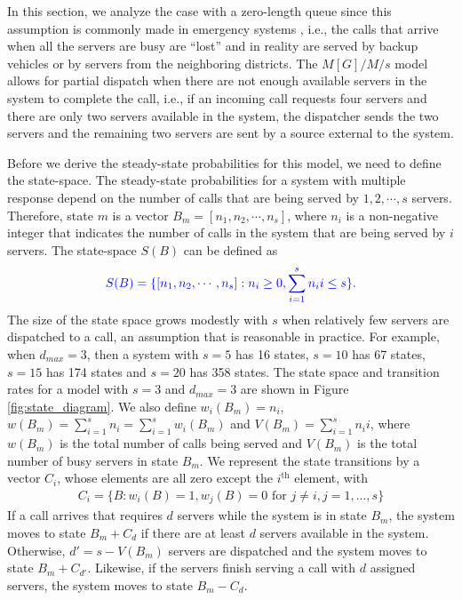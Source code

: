 \documentclass[11pt]{article}\topmargin 0mm
\begin{document}
In this section, we analyze the case with a zero-length queue
since this assumption is commonly made in emergency systems
\citep{iannoni2007multiple}, i.e., the calls that arrive when
all the servers are busy are ``lost'' and in reality are served
by backup vehicles or by servers from the neighboring
districts. The $M[G]/M/s$ model allows for partial dispatch
when there are not enough available servers in the system to
complete the call, i.e., if an incoming call requests four
servers and there are only two servers available in the system,
the dispatcher sends the two servers and the remaining two
servers are sent by a source external to the system.

Before we derive the steady-state probabilities for this model,
we need to define the state-space.
The steady-state probabilities for a system with multiple
response depend on the number of calls that are being served by
$1,2,\cdots,s$ servers. Therefore, state $m$ is a vector $B_m =
[n_1, n_2, \cdots, n_s]$, where $n_i$ is a non-negative integer
that indicates the number of calls in the system that are being
served by $i$ servers. The state-space $S(B)$ can be defined as
\begin{equation}
\label{eq:state_space}
\begin{split}
\color{blue}S(B) = \{[n_1, n_2, \cdots, n_s]:n_i\geq 0, \sum_{i=1}^s n_ii \leq s \}.
\end{split}
\end{equation}
The size of the state space grows modestly with $s$ when relatively few servers are dispatched to a call, an
assumption that is reasonable in practice. For example, when
$d_{max}=3$, then a system with $s=5$ has 16 states, $s=10$ has
67 states, $s=15$ has 174 states and $s=20$ has 358 states. The state space and transition rates for a model with $s=3$ and $d_{max}=3$ are shown in Figure \ref{fig:state_diagram}. We
also define $w_i(B_m)=n_i$, $w(B_m)=\sum_{i=1}^{s} n_i =
\sum_{i=1}^{s} w_i(B_m)$ and $V(B_m)=\sum_{i=1}^{s} n_ii$,
where $w(B_m)$ is the total number of calls being served and
$V(B_m)$ is the total number of busy servers in state $B_m$. We
represent the state transitions by a vector $C_i$, whose
elements are all zero except the $i^{\text{th}}$ element, with
\begin{equation}
\begin{split}
C_i = \{B:w_i(B)=1, w_j(B)=0 \text{ for } j\neq i, j=1,...,s\}
\end{split}
\end{equation}
If a call arrives that requires $d$ servers while the system is
in state $B_m$, the system moves to state $B_m+C_d$ if there
are at least $d$ servers available in the system. Otherwise,
$d'=s-V(B_m)$ servers are dispatched and the system moves to
state $B_m+C_{d'}$. Likewise, if the servers finish serving a
call with $d$ assigned servers, the system moves to state $B_m-C_d$.
\end{document}
